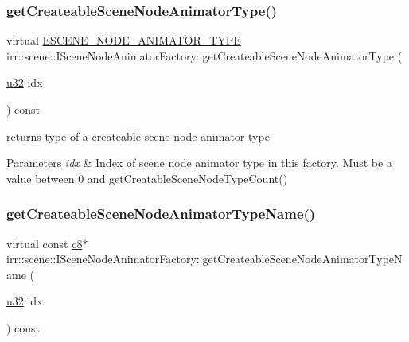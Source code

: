 \subsubsection{\texorpdfstring{get\+Createable\+Scene\+Node\+Animator\+Type()}{getCreateableSceneNodeAnimatorType()}}
{\footnotesize\ttfamily virtual \hyperlink{namespaceirr_1_1scene_a327a1e43872705cf8f3f3342fb307d19}{E\+S\+C\+E\+N\+E\+\_\+\+N\+O\+D\+E\+\_\+\+A\+N\+I\+M\+A\+T\+O\+R\+\_\+\+T\+Y\+PE} irr\+::scene\+::\+I\+Scene\+Node\+Animator\+Factory\+::get\+Createable\+Scene\+Node\+Animator\+Type (\begin{DoxyParamCaption}\item[{\hyperlink{namespaceirr_a0416a53257075833e7002efd0a18e804}{u32}}]{idx }\end{DoxyParamCaption}) const\hspace{0.3cm}{\ttfamily [pure virtual]}}



returns type of a createable scene node animator type 


\begin{DoxyParams}{Parameters}
{\em idx} & Index of scene node animator type in this factory. Must be a value between 0 and get\+Creatable\+Scene\+Node\+Type\+Count() \\
\hline
\end{DoxyParams}
\mbox{\label{classirr_1_1scene_1_1ISceneNodeAnimatorFactory_af33905c1ad6cd478bfbcbda33c82e3bd}} 
\subsubsection{\texorpdfstring{get\+Createable\+Scene\+Node\+Animator\+Type\+Name()}{getCreateableSceneNodeAnimatorTypeName()}\hspace{0.1cm}{\footnotesize\ttfamily [1/2]}}
{\footnotesize\ttfamily virtual const \hyperlink{namespaceirr_a9395eaea339bcb546b319e9c96bf7410}{c8}$\ast$ irr\+::scene\+::\+I\+Scene\+Node\+Animator\+Factory\+::get\+Createable\+Scene\+Node\+Animator\+Type\+Name (\begin{DoxyParamCaption}\item[{\hyperlink{namespaceirr_a0416a53257075833e7002efd0a18e804}{u32}}]{idx }\end{DoxyParamCaption}) const\hspace{0.3cm}{\ttfamily [pure virtual]}}



